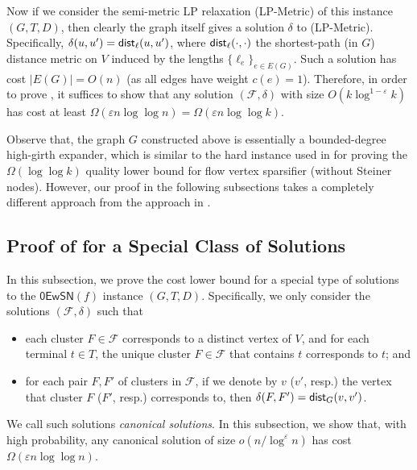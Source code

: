 \documentclass[11pt]{article}
\theoremstyle{definition}
\newcommand{\fset}{{\mathcal{F}}}
\newcommand{\eps}{{\varepsilon}}
\newcommand{\dist}{\textnormal{\textsf{dist}}}
\newcounter{note}
\newcommand{\zesn}{\mathsf{0EwSN}}
\begin{document}
Now if we consider the semi-metric LP relaxation (\textsf{LP-Metric}) of this instance $(G,T,D)$, then clearly the graph itself gives a solution $\delta$ to (\textsf{LP-Metric}). Specifically, $\delta(u,u')=\dist_{\ell}(u,u')$, where $\dist_{\ell}(\cdot,\cdot)$ the shortest-path (in $G$) distance metric on $V$ induced by the lengths $\{\ell_e\}_{e\in E(G)}$. Such a solution has cost $|E(G)|=O(n)$ (as all edges have weight $c(e)=1$). Therefore, in order to prove , it suffices to show that any solution $(\fset,\delta)$ with size $O(k\log^{1-\eps}k)$ has cost at least $\Omega(\eps n\log\log n)=\Omega(\eps n\log\log k)$.

Observe that, the graph $G$ constructed above is essentially a bounded-degree high-girth expander, which is similar to the hard instance used in \cite{leighton2010extensions} for proving the $\Omega(\log\log k)$ quality lower bound for flow vertex sparsifier (without Steiner nodes). However, our proof in the following subsections takes a completely different approach from the approach in \cite{leighton2010extensions}.






\subsection{Proof of  for a Special Class of Solutions}
\label{subsec: canonical}

In this subsection, we prove the cost lower bound for a special type of solutions to the $\zesn(f)$ instance $(G,T,D)$. Specifically, we only consider the solutions $(\fset, \delta)$ such that 
\begin{itemize}
\item each cluster $F\in \fset$ corresponds to a distinct vertex of $V$, and for each terminal $t\in T$, the unique cluster $F\in \fset$ that contains $t$ corresponds to $t$; and
\item for each pair $F,F'$ of clusters in $\fset$, if we denote by $v$ ($v'$, resp.) the vertex that cluster $F$ ($F'$, resp.) corresponds to, then $\delta(F,F')=\dist_{G}(v,v')$.
\end{itemize}
We call such solutions \emph{canonical solutions}.
%
In this subsection, we show that, with high probability, any canonical solution of size $o(n/\log^{\eps} n)$ has cost $\Omega(\eps n\log \log n)$. 
\end{document}
